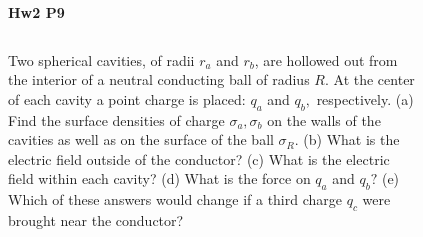 \documentclass{beamer}
\begin{document}
\begin{frame}{\bf Hw2 P9}
    \begin{columns}
        \begin{column}{.7\linewidth}
            Two spherical cavities, of radii $r_{a}$ and $r_{b}$, are hollowed out from the interior of a neutral conducting ball of radius $R$. At the center of each cavity a point charge is placed: $q_{a}$ and $q_{b},$ respectively.
            (a) Find the surface densities of charge $\sigma_{a}, \sigma_{b}$ on the walls of the cavities as well as on the surface of the ball $\sigma_{R}$.
            (b) What is the electric field outside of the conductor?
            (c) What is the electric field within each cavity?
            (d) What is the force on $q_{a}$ and $q_{b} ?$
            (e) Which of these answers would change if a third charge $q_{c}$ were brought near the conductor?

        \end{column}
        \begin{column}{.3\linewidth}
            \begin{figure}
                \centering
                \includegraphics[scale=0.4]{images/ex2.png}
            \end{figure}
        \end{column}
    \end{columns}

\end{frame}
\end{document}
